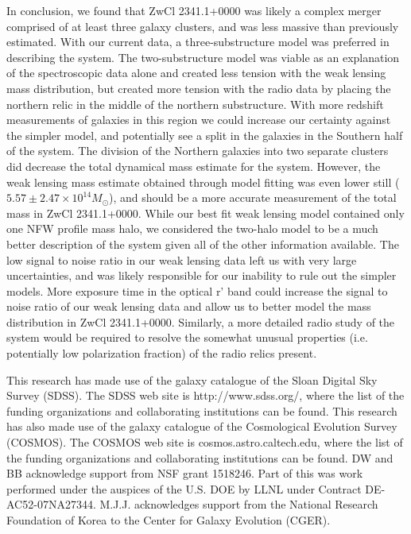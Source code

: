 \documentclass[onecolumn]{aastex}
\begin{document}
In conclusion, we found that ZwCl 2341.1+0000 was likely a complex merger comprised of at least three galaxy clusters, and was less massive than previously estimated.  With our current data, a three-substructure model was preferred in describing the system.  The two-substructure model was viable as an explanation of the spectroscopic data alone and created less tension with the weak lensing mass distribution, but created more tension with the radio data by placing the northern relic in the middle of the northern substructure.  With more redshift measurements of galaxies in this region we could increase our certainty against the simpler model, and potentially see a split in the galaxies in the Southern half of the system.  The division of the Northern galaxies into two separate clusters did decrease the total dynamical mass estimate for the system.  However, the weak lensing mass estimate obtained through model fitting was even lower still ($5.57 \pm 2.47 \times 10^{14} M_{\odot}$), and should be a more accurate measurement of the total mass in ZwCl 2341.1+0000.  While our best fit weak lensing model contained only one NFW profile mass halo, we considered the two-halo model to be a much better description of the system given all of the other information available.  The low signal to noise ratio in our weak lensing data left us with very large uncertainties, and was likely responsible for our inability to rule out the simpler models.  More exposure time in the optical r' band could increase the signal to noise ratio of our weak lensing data and allow us to better model the mass distribution in ZwCl 2341.1+0000.  Similarly, a more detailed radio study of the system would be required to resolve the somewhat unusual properties (i.e. potentially low polarization fraction) of the radio relics present.

\acknowledgments
This research has made use of the galaxy catalogue of the Sloan Digital Sky Survey (SDSS). The SDSS web site is http://www.sdss.org/, where the list of the funding organizations and collaborating institutions can be found.  This research has also made use of the galaxy catalogue of the Cosmological Evolution Survey (COSMOS).  The COSMOS web site is cosmos.astro.caltech.edu, where the list of the funding organizations and collaborating institutions can be found.  DW and BB acknowledge support from NSF grant 1518246.  Part of this was work performed under the auspices of the U.S. DOE by LLNL under Contract DE-AC52-07NA27344.  M.J.J. acknowledges support from the National Research Foundation of Korea to the Center for Galaxy Evolution (CGER).
\end{document}
